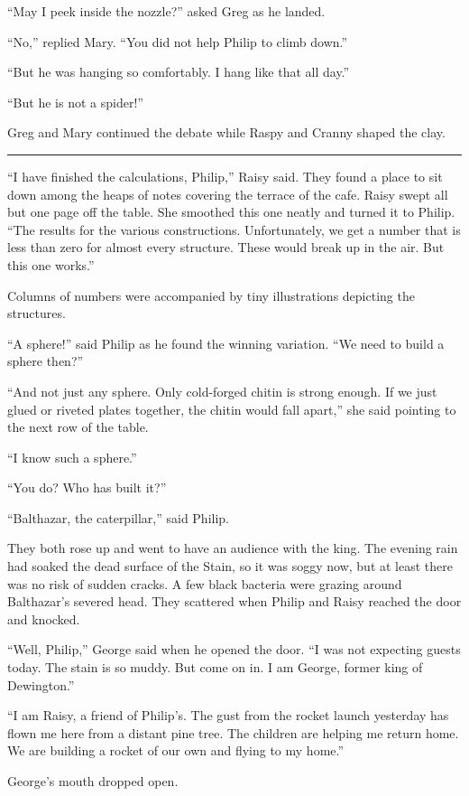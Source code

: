 \documentclass[10pt, draft]{memoir}
\renewcommand{\pfbreakdisplay}{\bigskip \ding{166} \bigskip}
\newcommand{\secbreak}{\fancybreak{\pfbreakdisplay}}
\begin{document}
``May I peek inside the nozzle?'' asked Greg as he landed.

``No,'' replied Mary. ``You did not help Philip to climb down.''

``But he was hanging so comfortably. I hang like that all day.''

``But he is not a spider!''

Greg and Mary continued the debate while Raspy and Cranny shaped the clay.

\secbreak

``I have finished the calculations, Philip,'' Raisy said. They found a place to sit down among the heaps of notes covering the terrace of the cafe. Raisy swept all but one page off the table. She smoothed this one neatly and turned it to Philip. ``The results for the various constructions. Unfortunately, we get a number that is less than zero for almost every structure. These would break up in the air. But this one works.''

Columns of numbers were accompanied by tiny illustrations depicting the structures.

``A sphere!'' said Philip as he found the winning variation. ``We need to build a sphere then?''

``And not just any sphere. Only cold-forged chitin is strong enough. If we just glued or riveted plates together, the chitin would fall apart,'' she said pointing to the next row of the table.

``I know such a sphere.''

``You do? Who has built it?''

``Balthazar, the caterpillar,'' said Philip.

They both rose up and went to have an audience with the king. The evening rain had soaked the dead surface of the Stain, so it was soggy now, but  at least there was no risk of sudden cracks. A few black bacteria were grazing around Balthazar's severed head. They scattered when Philip and Raisy reached the door and knocked.

``Well, Philip,'' George said when he opened the door. ``I was not expecting guests today. The stain is so muddy. But come on in. I am George, former king of Dewington.''

``I am Raisy, a friend of Philip's. The gust from the rocket launch yesterday has flown me here from a distant pine tree. The children are helping me return home. We are building a rocket of our own and flying to my home.''

George's mouth dropped open.
\end{document}

